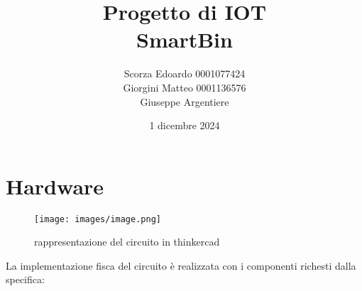 \documentclass[a4paper,12pt]{report}
\title{Progetto di IOT
    \\ SmartBin}
\author{Scorza Edoardo 0001077424 \\ Giorgini Matteo 0001136576 \\ Giuseppe Argentiere }
\date{1 dicembre 2024}
\begin{document}
\maketitle
\tableofcontents
\chapter{Hardware}
\begin{figure}[H] %
    \centering
    \texttt{[image: images/image.png]} %
    \caption{rappresentazione del circuito in thinkercad}
    \label{fig:sample-image} %
\end{figure}
\vspace{1cm}
La implementazione fisca del circuito è realizzata con i componenti 
richesti dalla specifica:
\end{document}
